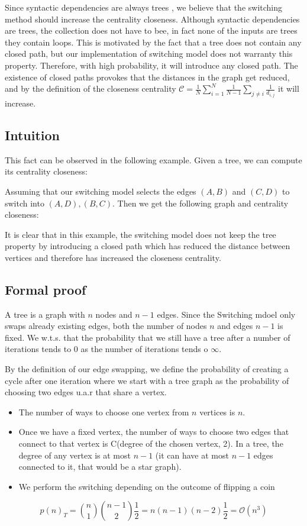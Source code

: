 
Since syntactic dependencies are always trees \cite{i2004patterns}, we believe that the switching method should increase the centrality closeness. Although syntactic dependencies are trees, the collection does not have to bee, in fact none of the inputs are trees they contain loops. This is motivated by the fact that a tree does not contain any closed path, but our implementation of switching model does not warranty this property. Therefore, with high probability, it will introduce any closed path. The existence of closed paths provokes that the distances in the graph get reduced, and by the definition of the closeness centrality $\mathcal{C} = \frac{1}{N}\sum_{i=1}^N\frac{1}{N-1}\sum_{j \neq i}\frac{1}{d_{i,j}}$ it will increase.

\subsection{Intuition}
This fact can be observed in the following example. Given a tree, we can compute its centrality closeness:


Assuming that our switching model selects the edges $(A,B)$ and $(C,D)$ to switch into $(A,D),(B,C)$. Then we get the following graph and centrality closeness:



It is clear that in this example, the switching model does not keep the tree property by introducing a closed path which has reduced the distance between vertices and therefore has increased the closeness centrality.

\subsection{Formal proof}
A tree is a graph with $n$ nodes and $n-1$ edges. Since the Switching mdoel only swaps already existing edges, both the number of nodes $n$ and  edges $n-1$ is fixed. We w.t.s. that the probability that we still have a tree after a number of iterations tends to 0 as the number of iterations tends o $\infty$.

By the definition of our edge swapping, we define the probability of creating a cycle after one iteration where we start with a tree graph as the probability of choosing two edges u.a.r that share a vertex.
\begin{itemize}
    \item The number of ways to choose one vertex from $n$ vertices is $n$.
    \item Once we have a fixed vertex, the number of ways to choose two edges that connect to that vertex is C(degree of the chosen vertex, 2). In a tree, the degree of any vertex is at most $n-1$ (it can have at most $n-1$ edges connected to it, that would be a star graph).
    \item We perform the switching depending on the outcome of flipping a coin
\end{itemize}
\begin{equation*}
    p(n)_T = {n \choose 1} {n-1 \choose 2} \dfrac{1}{2}= n(n-1)(n-2)\dfrac{1}{2} = \mathcal{O}(n^3)
\end{equation*}

